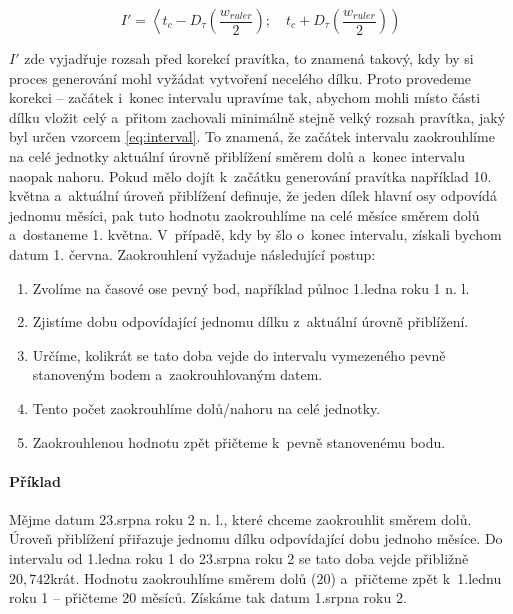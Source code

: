 				\begin{equation}
					\label{eq:interval}
					I' = \left\langle t_c - D_\tau \left(\frac{w_{ruler}}{2}\right);\quad t_c + D_\tau\left(\frac{w_{ruler}}{2}\right)\right)
				\end{equation}
				
				$I'$ zde vyjadřuje rozsah před korekcí pravítka, to znamená takový, kdy by si proces generování mohl vyžádat vytvoření necelého dílku. Proto provedeme korekci -- začátek i~konec intervalu upravíme tak, abychom mohli místo části dílku vložit celý a~přitom zachovali minimálně stejně velký rozsah pravítka, jaký byl určen vzorcem \ref{eq:interval}. To znamená, že začátek intervalu zaokrouhlíme na celé jednotky aktuální úrovně přiblížení směrem dolů a~konec intervalu naopak nahoru. Pokud mělo dojít k~začátku generování pravítka například 10. května a~aktuální úroveň přiblížení definuje, že jeden dílek hlavní osy odpovídá jednomu měsíci, pak tuto hodnotu zaokrouhlíme na celé měsíce směrem dolů a~dostaneme 1. května. V~případě, kdy by šlo o~konec intervalu, získali bychom datum 1. června. Zaokrouhlení vyžaduje následující postup:
				
				\begin{enumerate}	
					\item Zvolíme na časové ose pevný bod, například půlnoc 1.\ts ledna roku 1 n. l.
					\item Zjistíme dobu odpovídající jednomu dílku z~aktuální úrovně přiblížení.
					\item Určíme, kolikrát se tato doba vejde do intervalu vymezeného pevně stanoveným bodem a~zaokrouhlovaným datem.
					\item Tento počet zaokrouhlíme dolů/nahoru na celé jednotky.
					\item Zaokrouhlenou hodnotu zpět přičteme k~pevně stanovenému bodu.
				\end{enumerate}
				
				\paragraph{Příklad} Mějme datum 23.\ts srpna roku 2 n. l., které chceme zaokrouhlit směrem dolů. Úroveň přiblížení přiřazuje jednomu dílku odpovídající dobu jednoho mě\-síce. Do intervalu od 1.\ts ledna roku 1 do 23.\ts srpna roku 2 se tato doba vejde přibližně $20,\!742$krát. Hodnotu zaokrouhlíme směrem dolů ($20$) a~přičteme zpět k~1.\ts lednu roku 1 -- přičteme 20 měsíců. Získáme tak datum 1.\ts srpna roku 2.
				
